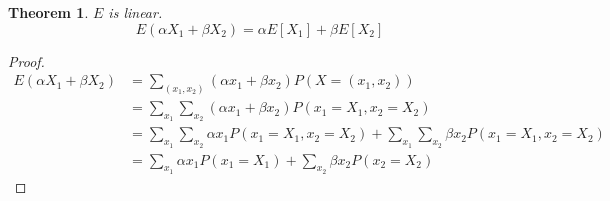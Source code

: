\documentclass{article}
\newtheorem{theorem}{Theorem}
\begin{document}
\begin{theorem}
  $ E $ is linear.
  \begin{displaymath}
    E(\alpha X_1 + \beta X_2) = \alpha E[X_1] + \beta E[X_2]
  \end{displaymath}
  
\end{theorem}
\begin{proof}
  
  \begin{align*}
    E(\alpha X_1 + \beta X_2) &= \sum_{(x_1, x_2)} (\alpha x_1 + \beta x_2)P(X=(x_1,x_2))\\
                              &= \sum_{x_1}\sum_{x_2} (\alpha x_1 +\beta x_2)P(x_1=X_1, x_2=X_2)\\
                              &= \sum_{x_1}\sum_{x_2}\alpha x_1P(x_1=X_1, x_2=X_2) + \sum_{x_1}\sum_{x_2} \beta x_2P(x_1=X_1, x_2=X_2)\\
                              &= \sum_{x_1} \alpha x_1 P(x_1=X_1) + \sum_{x_2}\beta x_2P(x_2=X_2)
  \end{align*}
  
\end{proof}



	
\end{document}
